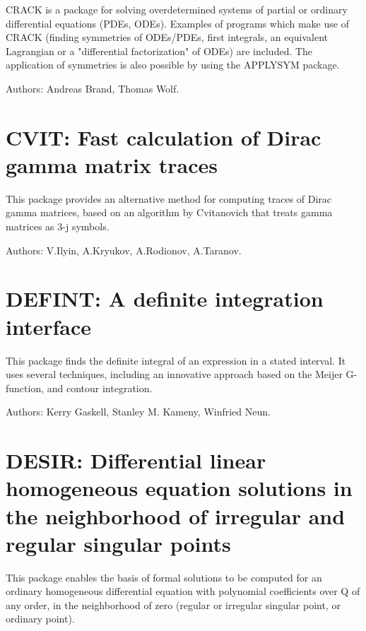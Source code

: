 CRACK is a package for solving overdetermined systems of partial or
ordinary differential equations (PDEs, ODEs).  Examples of programs which
make use of CRACK (finding symmetries of ODEs/PDEs, first integrals, an
equivalent Lagrangian or a "differential factorization" of ODEs) are
included.  The application of symmetries is also possible by using the
APPLYSYM package.

Authors: Andreas Brand, Thomas Wolf.

\newpage

\section{CVIT: Fast calculation of Dirac gamma matrix traces}
\label{CVIT}

This package provides an alternative method for computing traces of Dirac
gamma matrices, based on an algorithm by Cvitanovich that treats gamma
matrices as 3-j symbols.

Authors: V.Ilyin, A.Kryukov, A.Rodionov, A.Taranov.



\newpage

\section{DEFINT: A definite integration interface}
\label{DEFINT}

This package finds the definite integral of an expression in a stated
interval.  It uses several techniques, including an innovative approach
based on the Meijer G-function, and contour integration.

Authors: Kerry Gaskell, Stanley M. Kameny, Winfried Neun.



\newpage

\section{DESIR: Differential linear homogeneous equation solutions in the
              neighborhood of irregular and regular singular points}

This package enables the basis of formal solutions to be computed for an
ordinary homogeneous differential equation with polynomial coefficients
over Q of any order, in the neighborhood of zero (regular or irregular
singular point, or ordinary point).

